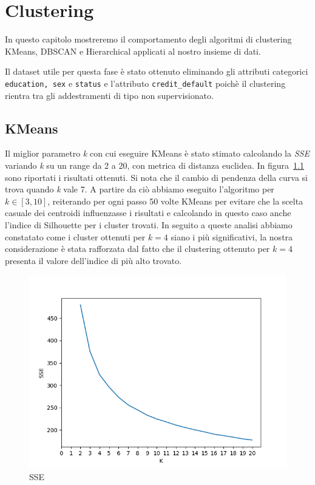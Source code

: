 \chapter{Clustering}
In questo capitolo mostreremo il comportamento 
degli algoritmi di clustering KMeans, DBSCAN 
e Hierarchical applicati al nostro insieme di 
dati.

Il dataset utile per questa fase \`e stato
ottenuto eliminando gli attributi categorici
\texttt{education, sex} e \texttt{status} 
e l'attributo \texttt{credit\_default} 
poich\`e il clustering rientra tra 
gli addestramenti di tipo non supervisionato.

\section{KMeans}

Il miglior parametro \textit{k} con cui eseguire 
KMeans \`e stato stimato calcolando la 
\textit{SSE} variando \textit{k} su un range da 
2 a 20, con metrica di distanza euclidea. 
In figura~\ref{fig:best_k} sono riportati 
i risultati ottenuti. Si nota che il cambio di
pendenza della curva si trova quando \textit{k}
vale 7. A partire da ci\`o abbiamo eseguito l'algoritmo
per $k\in[3,10]$, reiterando per ogni passo 50 volte
KMeans per evitare che la scelta casuale dei centroidi
influenzasse i risultati e calcolando in questo caso
anche l'indice di Silhouette per i cluster trovati.
In seguito a queste analisi abbiamo constatato come
i cluster ottenuti per $k=4$ siano i pi\`u significativi,
la nostra considerazione \`e stata rafforzata dal fatto
che il clustering ottenuto per $k=4$ presenta il valore
dell'indice di \sil pi\`u alto trovato.

\begin{figure}[H]
	\centering
	\includegraphics[width=\linewidth]{img/best_k.png}
	\caption[LOF entry]{SSE}
	\label{fig:best_k}
\end{figure} 

